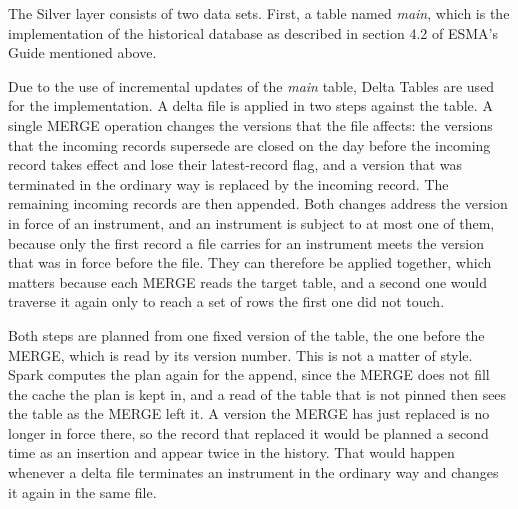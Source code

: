 The Silver layer consists of two data sets. First, a table named \emph{main}, which is the implementation of the historical database as described in section 4.2 of ESMA's Guide mentioned above.

Due to the use of incremental updates of the \emph{main} table, Delta Tables are used for the implementation. A delta file is applied in two steps against the table. A single MERGE operation changes the versions that the file affects: the versions that the incoming records supersede are closed on the day before the incoming record takes effect and lose their latest-record flag, and a version that was terminated in the ordinary way is replaced by the incoming record. The remaining incoming records are then appended. Both changes address the version in force of an instrument, and an instrument is subject to at most one of them, because only the first record a file carries for an instrument meets the version that was in force before the file. They can therefore be applied together, which matters because each MERGE reads the target table, and a second one would traverse it again only to reach a set of rows the first one did not touch.

Both steps are planned from one fixed version of the table, the one before the MERGE, which is read by its version number. This is not a matter of style. Spark computes the plan again for the append, since the MERGE does not fill the cache the plan is kept in, and a read of the table that is not pinned then sees the table as the MERGE left it. A version the MERGE has just replaced is no longer in force there, so the record that replaced it would be planned a second time as an insertion and appear twice in the history. That would happen whenever a delta file terminates an instrument in the ordinary way and changes it again in the same file.

